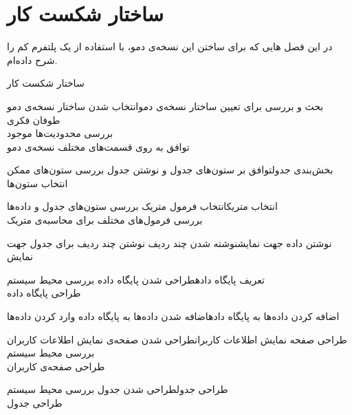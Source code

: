 \chapter{ساختار شکست کار}
در این فصل 
هایی
که برای ساختن این نسخه‌ی دمو، با استفاده از یک پلتفرم کم را شرح داده‌ام.

\begin{wbsbox}{ساختار شکست کار}
\begin{wbssub}{بحث و بررسی برای تعیین ساختار نسخه‌ی دمو}{انتخاب شدن ساختار نسخه‌ی دمو}
\task
طوفان فکری \\
\task 
بررسی محدودیت‌ها موجود \\
\task
توافق به روی قسمت‌های مختلف نسخه‌ی دمو
\end{wbssub}

\begin{wbssub}{بخش‌بندی جدول}{توافق بر ستون‌های جدول و نوشتن جدول}
\task بررسی ستون‌های ممکن \\
\task انتخاب ستون‌ها
\end{wbssub}

\begin{wbssub}{انتخاب متریک}{انتخاب فرمول متریک}
\task بررسی ستون‌های جدول و داده‌ها\\
\task بررسی فرمول‌های مختلف ‌برای محاسبه‌ی متریک
\end{wbssub}

\begin{wbssub}{نوشتن داده جهت نمایش}{نوشته شدن چند ردیف}
\task نوشتن چند ردیف برای جدول جهت نمایش
\end{wbssub}

\begin{wbssub}{تعریف پایگاه داده}{طراحی شدن پایگاه داده}
\task بررسی محیط سیستم  \\
\task طراحی پایگاه داده
\end{wbssub}

\begin{wbssub}{اضافه کردن داده‌ها به پایگاه داده}{اضافه شدن داده‌ها به پایگاه داده}
\task وارد کردن داده‌ها
\end{wbssub}

\begin{wbssub}{طراحی صفحه نمایش اطلاعات کاربران}{طراحی شدن صفحه‌ی نمایش اطلاعات کاربران}
\task بررسی محیط سیستم  \\
\task طراحی صفحه‌ی کاربران
\end{wbssub}

\begin{wbssub}{طراحی جدول}{طراحی شدن جدول}
\task بررسی محیط سیستم  \\
\task طراحی جدول
\end{wbssub}


\end{wbsbox}
